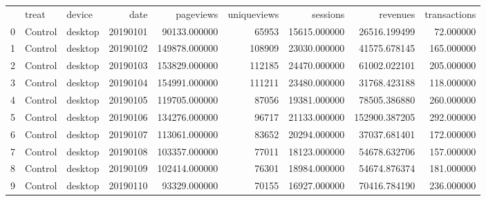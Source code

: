 \begin{tabular}{lllrrrrrr}
 & treat & device & date & pageviews & uniqueviews & sessions & revenues & transactions \\
0 & Control & desktop & 20190101 & 90133.000000 & 65953 & 15615.000000 & 26516.199499 & 72.000000 \\
1 & Control & desktop & 20190102 & 149878.000000 & 108909 & 23030.000000 & 41575.678145 & 165.000000 \\
2 & Control & desktop & 20190103 & 153829.000000 & 112185 & 24470.000000 & 61002.022101 & 205.000000 \\
3 & Control & desktop & 20190104 & 154991.000000 & 111211 & 23480.000000 & 31768.423188 & 118.000000 \\
4 & Control & desktop & 20190105 & 119705.000000 & 87056 & 19381.000000 & 78505.386880 & 260.000000 \\
5 & Control & desktop & 20190106 & 134276.000000 & 96717 & 21133.000000 & 152900.387205 & 292.000000 \\
6 & Control & desktop & 20190107 & 113061.000000 & 83652 & 20294.000000 & 37037.681401 & 172.000000 \\
7 & Control & desktop & 20190108 & 103357.000000 & 77011 & 18123.000000 & 54678.632706 & 157.000000 \\
8 & Control & desktop & 20190109 & 102414.000000 & 76301 & 18984.000000 & 54674.876374 & 181.000000 \\
9 & Control & desktop & 20190110 & 93329.000000 & 70155 & 16927.000000 & 70416.784190 & 236.000000 \\
\end{tabular}
